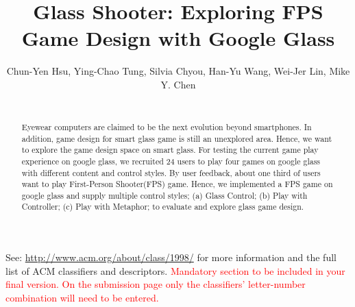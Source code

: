 \documentclass{sigchi}
\begin{document}
\title{Glass Shooter: Exploring FPS Game Design with Google Glass}

\author{\alignauthor Chun-Yen Hsu, Ying-Chao Tung, Silvia Chyou, Han-Yu Wang, Wei-Jer Lin, Mike Y. Chen \\
 \\ 
}



\maketitle





\begin{abstract}
Eyewear computers are claimed to be the next evolution beyond smartphones. In addition, game design for smart glass game is still an unexplored area. Hence, we want to explore the game design space on smart glass. For testing the current game play experience on google glass, we recruited 24 users to play four games on google glass with different content and control styles. By user feedback, about one third of users want to play First-Person Shooter(FPS) game. Hence, we implemented a FPS game on google glass and supply multiple control styles; (a) Glass Control; (b) Play with Controller; (c) Play with Metaphor; to evaluate and explore glass game design.
\end{abstract}



See: \url{http://www.acm.org/about/class/1998/}
for more information and the full list of ACM classifiers
and descriptors. 
\textcolor{red}{Mandatory section to be included in your
final version. On the submission page only the classifiers'
letter-number combination will need to be entered.}
\end{document}
